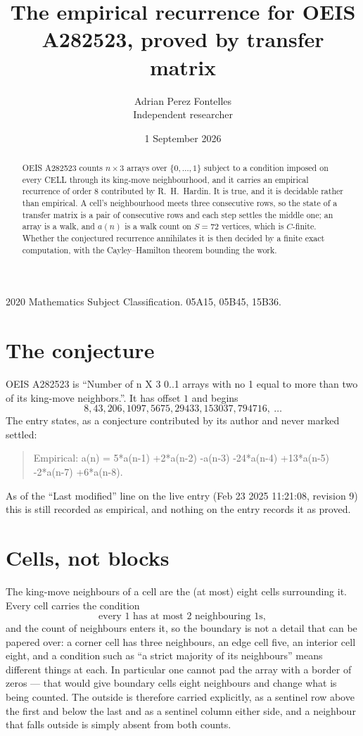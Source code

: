 \documentclass[11pt,a4paper]{article}
\title{The empirical recurrence for OEIS A282523, proved by transfer matrix}
\author{Adrian Perez Fontelles\\ \small Independent researcher}
\date{1 September 2026}
\theoremstyle{plain}
\theoremstyle{definition}
\begin{document}
\maketitle

\begin{abstract}
OEIS A282523 counts $n\times3$ arrays over $\{0,\dots,1\}$ subject to a condition imposed on
every CELL through its king-move neighbourhood, and it carries an empirical recurrence of
order $8$ contributed by R.~H.~Hardin. It is true, and it is decidable rather than
empirical. A cell's neighbourhood meets three consecutive rows, so the state of a transfer
matrix is a pair of consecutive rows and each step settles the middle one; an array is a
walk, and $a(n)$ is a walk count on $S=72$ vertices, which is $C$-finite. Whether the
conjectured recurrence annihilates it is then decided by a finite exact computation, with the
Cayley--Hamilton theorem bounding the work.
\end{abstract}

\noindent\small 2020 Mathematics Subject Classification. 05A15, 05B45, 15B36.\normalsize

\section{The conjecture}

OEIS A282523 is ``Number of n X 3 0..1 arrays with no 1 equal to more than two of its king-move neighbors.''. It has offset $1$ and begins
\[
8, 43, 206, 1097, 5675, 29433, 153037, 794716,\ \dots
\]
The entry states, as a conjecture contributed by its author and never marked settled:
\begin{quote}
Empirical: a(n) = 5*a(n-1) +2*a(n-2) -a(n-3) -24*a(n-4) +13*a(n-5) -2*a(n-7) +6*a(n-8).
\end{quote}
As of the ``Last modified'' line on the live entry (Feb 23 2025 11:21:08, revision 9) this is still
recorded as empirical, and nothing on the entry records it as proved.

\section{Cells, not blocks}

The king-move neighbours of a cell are the (at most) eight cells surrounding it. Every cell
carries the condition
\[
\text{every }1\text{ has at most }2\text{ neighbouring }1\text{s},
\]
and the count of neighbours enters it, so the boundary is not a detail that can be papered
over: a corner cell has three neighbours, an edge cell five, an interior cell eight, and a
condition such as ``a strict majority of its neighbours'' means different things at each. In
particular one cannot pad the array with a border of zeros --- that would give boundary cells
eight neighbours and change what is being counted. The outside is therefore carried
explicitly, as a sentinel row above the first and below the last and as a sentinel column
either side, and a neighbour that falls outside is simply absent from both counts.
\end{document}
